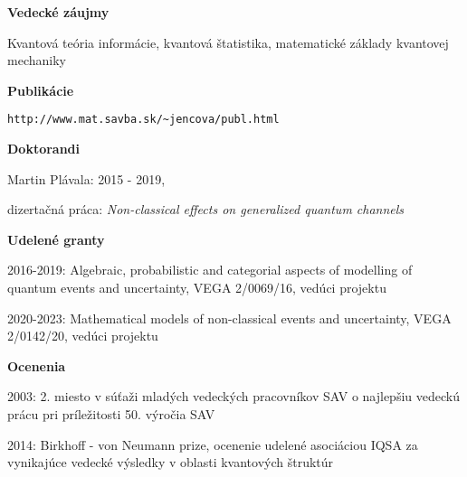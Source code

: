 \documentclass[12pt]{article}
\begin{document}
\noindent
\textbf{Vedecké záujmy}
\begin{description}[noitemsep,leftmargin=3cm, font=\normalfont]
\item Kvantová teória informácie, kvantová štatistika, matematické základy kvantovej mechaniky
\end{description}


\noindent
\textbf{Publikácie}

\begin{verbatim}http://www.mat.savba.sk/~jencova/publ.html\end{verbatim}


\noindent
\textbf{Doktorandi}
\begin{description}[noitemsep,leftmargin=1.3cm, font=\normalfont]
\item{Martin Plávala:} 2015 - 2019, 

dizertačná práca: \emph{Non-classical effects on generalized quantum channels}
 
\end{description}

\noindent
\textbf{Udelené granty}
\begin{description}[noitemsep,leftmargin=1.3cm, font=\normalfont]
\item{2016-2019:} Algebraic, probabilistic and categorial aspects of modelling of quantum
events and uncertainty, VEGA 2/0069/16, vedúci projektu
\item{2020-2023:} Mathematical models of non-classical events and uncertainty, VEGA
2/0142/20, vedúci projektu

\end{description}

\noindent
\textbf{Ocenenia}
\begin{description}[noitemsep,leftmargin=1.3cm, font=\normalfont]
\item{2003: }   2. miesto v súťaži  mladých vedeckých pracovníkov SAV o najlepšiu vedeckú prácu pri príležitosti 50. výročia SAV

\item{2014:} Birkhoff - von Neumann prize, ocenenie udelené asociáciou IQSA za vynikajúce vedecké výsledky v oblasti kvantových štruktúr
\end{description}
\end{document}
